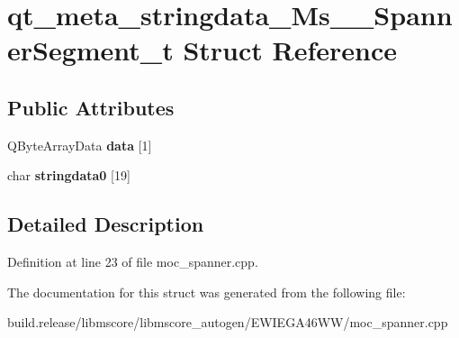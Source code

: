 \hypertarget{structqt__meta__stringdata___ms_____spanner_segment__t}{}\section{qt\+\_\+meta\+\_\+stringdata\+\_\+\+Ms\+\_\+\+\_\+\+Spanner\+Segment\+\_\+t Struct Reference}
\label{structqt__meta__stringdata___ms_____spanner_segment__t}
\subsection*{Public Attributes}
\begin{DoxyCompactItemize}
\item 
\mbox{\label{structqt__meta__stringdata___ms_____spanner_segment__t_ac33b492a9ac42e825892706907a30012}} 
Q\+Byte\+Array\+Data {\bfseries data} \mbox{[}1\mbox{]}
\item 
\mbox{\label{structqt__meta__stringdata___ms_____spanner_segment__t_ab077a134068b44094e3cb512a6e6c054}} 
char {\bfseries stringdata0} \mbox{[}19\mbox{]}
\end{DoxyCompactItemize}


\subsection{Detailed Description}


Definition at line 23 of file moc\+\_\+spanner.\+cpp.



The documentation for this struct was generated from the following file\+:\begin{DoxyCompactItemize}
\item 
build.\+release/libmscore/libmscore\+\_\+autogen/\+E\+W\+I\+E\+G\+A46\+W\+W/moc\+\_\+spanner.\+cpp\end{DoxyCompactItemize}
